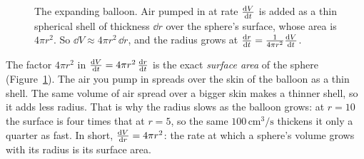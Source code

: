 \begin{figure}[H]
\centering
{}
\caption{The expanding balloon. Air pumped in at rate $\frac{\mathrm{d} V}{\mathrm{d} t}$ is added as a thin spherical shell
of thickness $\dd r$ over the sphere's surface, whose area is $4\pi r^2$. So
$\dd V \approx 4\pi r^2\,\dd r$, and the radius grows at $\frac{\mathrm{d} r}{\mathrm{d} t} = \frac{1}{4\pi r^2}\frac{\mathrm{d} V}{\mathrm{d} t}$.}
\label{ch13:fig-balloon}
\end{figure}

\begin{intuitionbox}
The factor $4\pi r^2$ in $\frac{\mathrm{d} V}{\mathrm{d} t} = 4\pi r^2\,\frac{\mathrm{d} r}{\mathrm{d} t}$ is the exact
\emph{surface area} of the sphere (Figure~\ref{ch13:fig-balloon}). The air you pump in spreads over
the skin of the balloon as a thin shell. The same volume of air spread over a bigger skin makes a
thinner shell, so it adds less radius. That
is why the radius slows as the balloon grows: at $r=10$ the surface is four times that at
$r=5$, so the same $100\,\text{cm}^3/\text{s}$ thickens it only a quarter as fast. In short, $\frac{\mathrm{d} V}{\mathrm{d} r} =
4\pi r^2$: the rate at which a sphere's volume grows with its radius is its surface area.
\end{intuitionbox}

